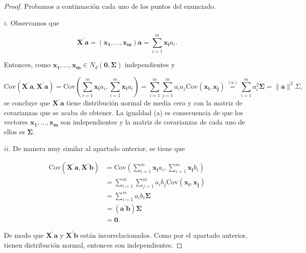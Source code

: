 \documentclass[
  a4paper,
  oneside]{scrbook}
\theoremstyle{definition}
\theoremstyle{definition}
\theoremstyle{definition}
\theoremstyle{definition}
\theoremstyle{remark}
\begin{document}
\begin{proof}
Probamos a continuación cada uno de los puntos del enunciado.

\(i.\) Observamos que

\[\bm{X}^\prime{}\bm{a}=\left(\bm{x_1},\ldots,\bm{x_m}\right)\bm{a}=\sum_{i=1}^m \bm{x_i} a_i.\]

Entonces, como \(\bm{x_1},\ldots,\bm{x_m}\in N_d(\bm{0},\bm\Sigma)\)
independientes y

\[\mbox{Cov}\left(\bm{X}^\prime{}\bm{a},\bm{X}^\prime{}\bm{a}\right)=\mbox{Cov}\left(\sum_{i=1}^m \bm{x_i} a_i,\sum_{i=1}^m \bm{x_i} a_i\right)=\sum_{i=1}^m\sum_{j=1}^m
a_i a_j \mbox{Cov}\left(\bm{x_i},\bm{x_j}\right)
\stackrel{(a)}{=}\sum_{i=1}^m a_i^2 \bm\Sigma =\|\bm{a}\|^2\Sigma,\] se
concluye que \(\bm{X}^\prime{}\bm{a}\) tiene distribución normal de media
cero y con la matriz de covarianzas que se acaba de obtener. La igualdad
(a) es consecuencia de que los vectores \(\bm{x_1},\ldots,\bm{x_m}\) son
independientes y la matriz de covarianzas de cada uno de ellos es
\(\bm\Sigma\).

\(ii.\) De manera muy similar al apartado anterior, se tiene que

\[\begin{aligned}
\mbox{Cov}\left(\bm{X}^\prime{}\bm{a},\bm{X}^\prime{}\bm{b}\right)&=\mbox{Cov}\left(\sum_{i=1}^m \bm{x_i} a_i,\sum_{i=1}^m \bm{x_i} b_i\right)\\
&=\sum_{i=1}^m\sum_{j=1}^m a_i b_j \mbox{Cov}\left(\bm{x_i},\bm{x_j}\right)\\
&=\sum_{i=1}^m a_ib_i \bm\Sigma\\
&=\left(\bm{a}^\prime{}\bm{b}\right)\bm\Sigma\\
&=\bm{0}.
\end{aligned}\]

De modo que \(\bm{X}^\prime{}\bm{a}\) y \(\bm{X}^\prime{}\bm{b}\) están
incorrelacionados. Como por el apartado anterior, tienen distribución
normal, entonces son independientes.
\end{proof}
\end{document}
